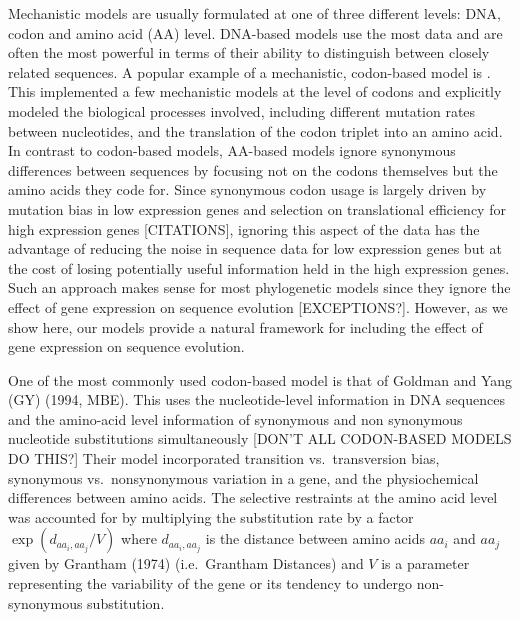 \documentclass[13pt]{article}
\begin{document}
Mechanistic models are usually formulated at one of three different levels: DNA, codon and amino acid (AA) level.
DNA-based models use the most data and are often the most powerful in terms of their ability to distinguish between closely related sequences.
A popular example of a mechanistic, codon-based model is \cite{YangEtAl98}.
This implemented a few mechanistic models at the level of codons and explicitly modeled the biological processes involved, including different mutation rates between nucleotides, and the translation of the codon triplet into an amino acid. 
In contrast to codon-based models, AA-based models ignore synonymous differences between sequences by focusing not on the codons themselves but the amino acids they code for.
Since synonymous codon usage is largely driven by mutation bias in low expression genes and selection on translational efficiency for high expression genes [CITATIONS], ignoring this aspect of the data has the advantage of reducing the noise in sequence data for low expression genes but at the cost of losing potentially useful information held in the high expression genes.
Such an approach makes sense for most phylogenetic models since they ignore the effect of gene expression on sequence evolution [EXCEPTIONS?].
However, as we show here, our models provide a natural framework for including the effect of gene expression on sequence evolution.


One of the most commonly used codon-based model is that of Goldman and Yang (GY) (1994, MBE).
This uses the nucleotide-level information in DNA sequences and the amino-acid level information of synonymous and non synonymous nucleotide substitutions simultaneously [DON'T ALL CODON-BASED MODELS DO THIS?]
Their model incorporated transition vs.~transversion bias, synonymous vs.~nonsynonymous variation in a gene, and the physiochemical differences between amino acids.
The selective restraints at the amino acid level was accounted for by multiplying the substitution rate by a factor $\exp (d_{aa_i,aa_j}/V)$ where $d_{aa_i, aa_j}$ is the distance between amino acids $aa_i$ and $aa_j$ given by Grantham (1974) (i.e.~Grantham Distances) and $V$ is a parameter representing the variability of the gene or its tendency to undergo non-synonymous substitution.
\end{document}
